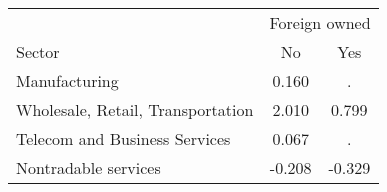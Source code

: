 \begin{tabular}{lcc}
\toprule
 & \multicolumn{2}{c}{Foreign owned} \\
\cmidrule(lr){2-3}
Sector & No & Yes \\
\midrule
Manufacturing & 0.160 & . \\
Wholesale, Retail, Transportation & 2.010 & 0.799 \\
Telecom and Business Services & 0.067 & . \\
Nontradable services & -0.208 & -0.329 \\
\bottomrule
\end{tabular}
